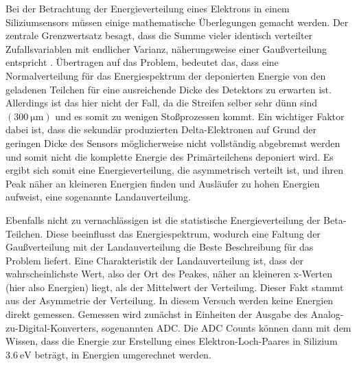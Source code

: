 Bei der Betrachtung der Energieverteilung eines Elektrons in einem 
Siliziumsensors müssen einige mathematische Überlegungen gemacht werden. Der 
zentrale Grenzwertsatz besagt, dass die Summe vieler identisch verteilter
Zufallsvariablen mit endlicher Varianz, näherungsweise einer Gaußverteilung 
entspricht \cite{Grenzwert}. Übertragen auf das Problem, bedeutet das, dass eine 
Normalverteilung für das Energiespektrum der deponierten Energie von den 
geladenen Teilchen für eine ausreichende Dicke des Detektors zu erwarten ist. 
Allerdings ist das hier nicht der Fall, da die Streifen selber sehr dünn sind 
$\left(\SI{300}{\micro\meter}  \right)$ und es somit zu wenigen Stoßprozessen 
kommt. Ein wichtiger Faktor dabei ist, dass die sekundär produzierten 
Delta-Elektronen auf Grund der geringen Dicke des Sensors möglicherweise nicht 
vollständig abgebremst werden und somit nicht die komplette Energie des Primärteilchens 
deponiert wird. Es ergibt sich somit eine Energieverteilung, die asymmetrisch 
verteilt ist, und ihren Peak näher an kleineren Energien finden und Ausläufer 
zu hohen Energien aufweist, eine sogenannte Landauverteilung. \par \smallskip 

Ebenfalls nicht zu vernachlässigen ist die statistische Energieverteilung der 
Beta-Teilchen. Diese beeinflusst das Energiespektrum, wodurch eine Faltung 
der Gaußverteilung mit der Landauverteilung die Beste Beschreibung für das 
Problem liefert.
Eine Charakteristik der Landauverteilung ist, dass der wahrscheinlichste Wert, 
also der Ort des Peakes, näher an kleineren x-Werten (hier also Energien) liegt, 
als der Mittelwert der Verteilung. Dieser Fakt stammt aus der Asymmetrie 
der Verteilung. In diesem Versuch werden keine Energien direkt gemessen. Gemessen 
wird zunächst in Einheiten der Ausgabe des Analog-zu-Digital-Konverters, sogenannten ADC. 
Die ADC Counts können dann mit dem Wissen, dass die Energie zur Erstellung eines 
Elektron-Loch-Paares in Silizium $\SI{3.6}{\electronvolt}$ beträgt, in 
Energien umgerechnet werden.